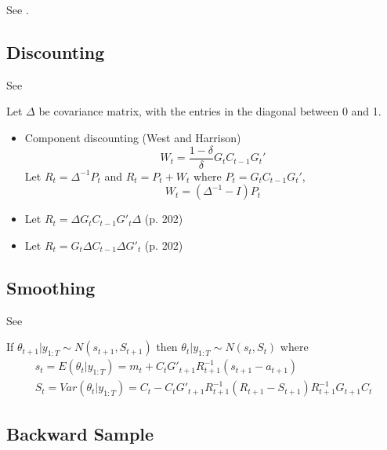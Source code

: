 \documentclass{article}
\begin{document}
See \textcite[Chapter 5, p. 57]{KoopmanShephardDoornik2008}.

\subsection{Discounting}
\label{sec:smoothing-1}

See \textcite[Chapter 6.3]{WestHarrison1997}

Let $\Delta$ be covariance matrix, with the entries in the diagonal between 0 and 1.

\begin{itemize}
\item Component discounting (West and Harrison)
  \begin{equation*}
    W_{t} = \frac{1 - \delta}{\delta} G_{t} C_{t - 1} G_{t}'
  \end{equation*}
  Let $R_{t} = \Delta^{-1} P_{t}$ and $R_{t} = P_{t} + W_{t}$ where $P_{t} = G_{t} C_{t-1} G_{t}'$,
  \begin{equation*}
    W_{t} = (\Delta^{-1} - I) P_{t} 
  \end{equation*}
\item Let $R_{t} = \Delta G_{t} C_{t-1} G'_{t} \Delta$ (p. 202)
\item Let $R_{t} = G_{t} \Delta C_{t-1} \Delta G'_{t}$ (p. 202)
\end{itemize}

\subsection{Smoothing}
\label{sec:smoothing}

See \textcite[Prop 2.4, p. 61]{PetrisPetroneEtAl2009}

If $\theta_{t+1} | y_{1:T} \sim N(s_{t+1}, S_{t+1})$ then $\theta_{t} | y_{1:T} \sim N(s_{t}, S_{t})$ where
\begin{align*}
  s_{t} = E(\theta_{t} | y_{1:T}) = m_{t} + C_{t} G'_{t+1} R_{t+1}^{-1}(s_{t+1} - a_{t+1}) \\
  S_{t} = Var(\theta_{t} | y_{1:T}) = C_{t} - C_{t} G'_{t+1} R^{-1}_{t+1} (R_{t+1} - S_{t+1}) R^{-1}_{t+1} G_{t+1} C_{t}
\end{align*}

\subsection{Backward Sample}
\label{sec:backward-sample}

\textcite[Chapter 4.4.1, p. 161]{PetrisPetroneEtAl2009}
\end{document}
